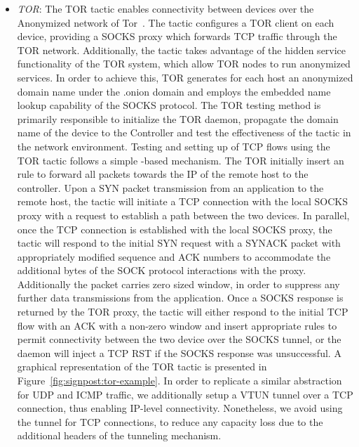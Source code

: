 \begin{itemize}
  \item \emph{TOR}: The TOR tactic enables connectivity between devices over the
    Anonymized network of Tor~\cite{dingledine2006}. The tactic configures a TOR
    client on each device, providing a SOCKS proxy which forwards TCP traffic
    through the TOR network.  Additionally, the tactic takes advantage of the
    hidden service functionality of the TOR system, which allow TOR nodes to run
    anonymized services. In order to achieve this, TOR generates for each host
    an anonymized domain name under the .onion domain and employs the embedded
    name lookup capability of the SOCKS protocol. The TOR testing method is 
    primarily responsible to initialize the TOR daemon, propagate the
    domain name of the device to the Controller and test the effectiveness of
    the tactic in the network environment.  Testing and setting up of TCP flows
    using the TOR tactic follows a simple \of-based mechanism. The TOR
    initially insert an \of rule to forward all packets towards the
    \signpost IP of the remote host to the controller. Upon a SYN packet
    transmission from an application to the remote \signpost host, the tactic
    will initiate a TCP connection with the local SOCKS proxy with a request to
    establish a path between the two devices. In parallel, once the TCP
    connection is established with the local SOCKS proxy, the tactic will
    respond to the initial SYN request with a SYNACK packet with appropriately
    modified sequence and ACK numbers to accommodate the additional bytes of the
    SOCK protocol interactions with the proxy. Additionally the packet carries 
    zero sized window, in order to suppress any further data transmissions from the
    application.  Once a SOCKS response is returned by the TOR proxy, the tactic
    will either respond to the initial TCP flow with an ACK with a non-zero
    window and insert appropriate \of rules to permit connectivity between the
    two device over the SOCKS tunnel, or the \signpost daemon will inject a TCP RST if the
    SOCKS response was unsuccessful. A graphical representation of the TOR
    tactic is presented in Figure~\ref{fig:signpost:tor-example}. 
      In order to replicate a similar abstraction
    for UDP and ICMP traffic, we additionally setup a VTUN tunnel over a TCP
    connection, thus enabling IP-level connectivity. Nonetheless, we avoid using
    the tunnel for TCP connections, to reduce any capacity loss due to the additional
    headers of the tunneling mechanism. 


\end{itemize}
